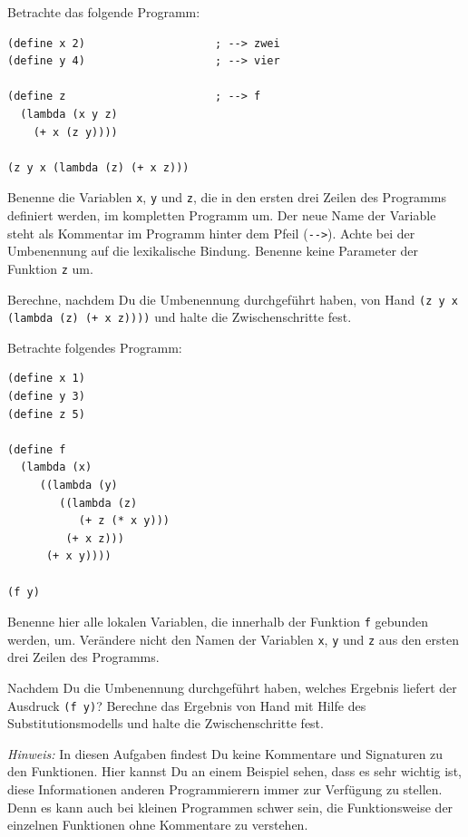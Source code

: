 \begin{aufgabe}

  Betrachte das folgende Programm:

\begin{lstlisting}
(define x 2)                    ; --> zwei
(define y 4)                    ; --> vier

(define z                       ; --> f
  (lambda (x y z)
    (+ x (z y))))

(z y x (lambda (z) (+ x z)))
\end{lstlisting}
%
  Benenne die Variablen \lstinline{x}, \lstinline{y} und \lstinline{z}, die in
  den ersten drei Zeilen des Programms definiert werden, im kompletten
  Programm um. Der neue Name der Variable steht als Kommentar im
  Programm hinter dem Pfeil (\lstinline{-->}).  Achte bei der
  Umbenennung auf die lexikalische Bindung.  Benenne keine
  Parameter der Funktion \lstinline{z} um.

  Berechne, nachdem Du die Umbenennung durchgeführt haben, von
  Hand \lstinline{(z y x}
  \lstinline{(lambda (z) (+ x z))))} und halte die Zwischenschritte
  fest.

\end{aufgabe}

\begin{aufgabe}
  Betrachte folgendes Programm:

\begin{lstlisting}
(define x 1)
(define y 3)
(define z 5)

(define f
  (lambda (x)   
     ((lambda (y)
        ((lambda (z)
           (+ z (* x y)))
         (+ x z)))
      (+ x y))))

(f y)
\end{lstlisting}

  Benenne hier alle lokalen Variablen, die innerhalb der Funktion
  \lstinline{f} gebunden werden, um. Verändere nicht den Namen der
  Variablen \lstinline{x}, \lstinline{y} und \lstinline{z} aus den ersten drei Zeilen
  des Programms.

  Nachdem Du die Umbenennung durchgeführt haben, welches Ergebnis liefert
  der Ausdruck \lstinline{(f y)}? Berechne das Ergebnis von Hand mit Hilfe
  des Substitutionsmodells und halte die Zwischenschritte fest.

  \noindent \emph{Hinweis:} In diesen Aufgaben findest Du keine
  Kommentare und Signaturen zu den Funktionen. Hier kannst Du an einem
  Beispiel sehen, dass es sehr wichtig ist, diese Informationen
  anderen Programmierern immer zur Verfügung zu stellen. Denn es kann
  auch bei kleinen Programmen schwer sein, die Funktionsweise der
  einzelnen Funktionen ohne Kommentare zu verstehen.
\end{aufgabe}


